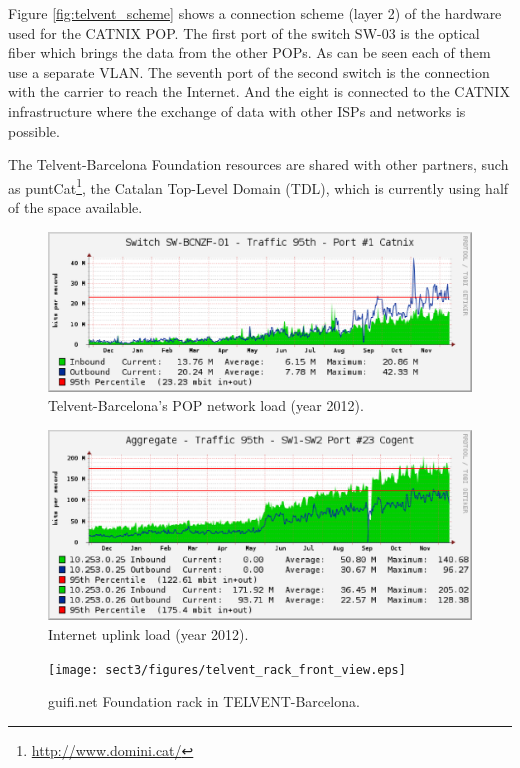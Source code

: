 Figure \ref{fig:telvent_scheme} shows a connection scheme (layer 2) of the hardware used for the CATNIX POP. 
The first port of the switch SW-03 is the optical fiber which brings the data from the other POPs. As can be seen each
of them use a separate VLAN. The seventh port of the second switch is the connection with the carrier to reach the Internet.
And the eight is connected to the CATNIX infrastructure where the exchange of data with other ISPs and networks is possible. 


The Telvent-Barcelona Foundation resources are shared with other partners, such as puntCat\footnote{\url{http://www.domini.cat/}}, the Catalan Top-Level Domain (TDL), which is currently using half of the space available.

\begin{figure}[htbp]
  \centering
  \includegraphics[scale=.65]{sect3/figures/catnix_network_load_year.eps} 
  \caption{Telvent-Barcelona's POP network load (year 2012).}
  \label{fig:catnix_net_load}
\end{figure}


\begin{figure}[htbp]
  \centering
  \includegraphics[scale=.65]{sect3/figures/cogent_network_load2.eps} 
  \caption{Internet uplink load (year 2012).}
  \label{fig:cogent_load}
\end{figure}


\begin{figure}[htbp]
  \centering
  \texttt{[image: sect3/figures/telvent\_rack\_front\_view.eps]} 
  \caption{guifi.net Foundation rack in TELVENT-Barcelona.}
  \label{fig:telvent_rack}
\end{figure}


